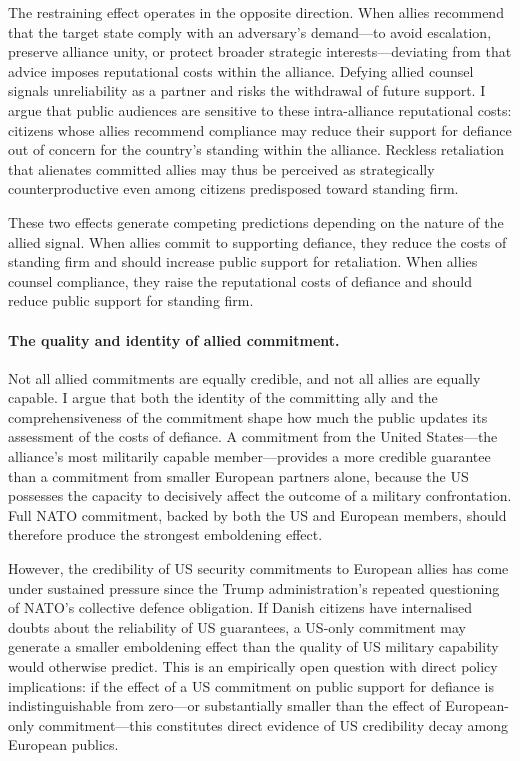 The restraining effect operates in the opposite direction. When allies recommend that the target state comply with an adversary's demand---to avoid escalation, preserve alliance unity, or protect broader strategic interests---deviating from that advice imposes reputational costs within the alliance. Defying allied counsel signals unreliability as a partner and risks the withdrawal of future support.\autocite{fang_concede_2014} I argue that public audiences are sensitive to these intra-alliance reputational costs: citizens whose allies recommend compliance may reduce their support for defiance out of concern for the country's standing within the alliance. Reckless retaliation that alienates committed allies may thus be perceived as strategically counterproductive even among citizens predisposed toward standing firm.

These two effects generate competing predictions depending on the nature of the allied signal. When allies commit to supporting defiance, they reduce the costs of standing firm and should increase public support for retaliation. When allies counsel compliance, they raise the reputational costs of defiance and should reduce public support for standing firm.

\paragraph{The quality and identity of allied commitment.}
Not all allied commitments are equally credible, and not all allies are equally capable. I argue that both the identity of the committing ally and the comprehensiveness of the commitment shape how much the public updates its assessment of the costs of defiance. A commitment from the United States---the alliance's most militarily capable member---provides a more credible guarantee than a commitment from smaller European partners alone, because the US possesses the capacity to decisively affect the outcome of a military confrontation. Full NATO commitment, backed by both the US and European members, should therefore produce the strongest emboldening effect.

However, the credibility of US security commitments to European allies has come under sustained pressure since the Trump administration's repeated questioning of NATO's collective defence obligation. If Danish citizens have internalised doubts about the reliability of US guarantees, a US-only commitment may generate a smaller emboldening effect than the quality of US military capability would otherwise predict. This is an empirically open question with direct policy implications: if the effect of a US commitment on public support for defiance is indistinguishable from zero---or substantially smaller than the effect of European-only commitment---this constitutes direct evidence of US credibility decay among European publics.

